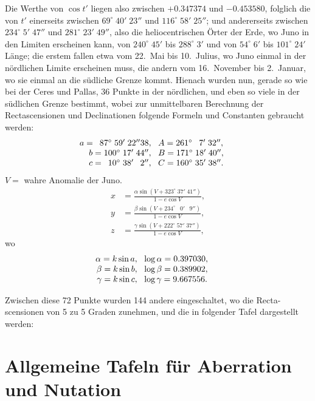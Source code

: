 \documentclass[12pt,a4paper]{article}
\begin{document}
Die Werthe von $\cos t'$ liegen also zwischen $+0.347374$ und $-0.453580$,
folglich die von $t'$ einerseits zwischen $69^{\circ}\;40'\;23''$ und $116^{\circ}\;58'\;25''$;
und andererseits zwischen $234^{\circ}\;5'\;47''$ und $281^{\circ}\;23'\;49''$, also die
heliocentrischen Örter der Erde, wo Juno in den Limiten erscheinen kann, von
$240^{\circ}\;45'$ bis $288^{\circ}\;3'$ und von $54^{\circ}\;6'$ bis $101^{\circ}\;24'$ Länge;
die erstem fallen etwa vom 22.\ Mai bis 10.\ Julius, wo Juno einmal in der
nördlichen Limite erscheinen muss, die andern vom 16.\ November bis 2.\ Januar,
wo sie einmal an die südliche Grenze kommt. Hienach wurden nun, gerade so
wie bei der Ceres und Pallas, 36 Punkte in der nördlichen, und eben so viele
in der südlichen Grenze bestimmt, wobei zur unmittelbaren Berechnung der
Rectascensionen und Declinationen folgende Formeln und Constanten gebraucht
werden:
\[
\begin{array}{r@{\;\;\;}l@{\qquad}r@{\;\;\;}l}
a = \phantom{0}87^{\circ}\;59'\;22''38, & A = 261^{\circ}\;\phantom{0}7'\;32'',\\
b = 100^{\circ}\;17'\;44'', & B = 171^{\circ}\;18'\;40'',\\
c = \phantom{0}10^{\circ}\;38'\;\phantom{0}2'', & C = 160^{\circ}\;35'\;38''.
\end{array}
\]
$V =$ wahre Anomalie der Juno.
\begin{align*}
x &= \frac{\alpha\sin(V + 323^{\circ}\;37'\;41'')}{1 - e\cos V},\\
y &= \frac{\beta\sin(V + 234^{\circ}\;\phantom{0}0'\;\phantom{0}9'')}{1 - e\cos V},\\
z &= \frac{\gamma\sin(V + 222^{\circ}\;57'\;37'')}{1 - e\cos V},
\end{align*}
wo
\[
\begin{array}{r@{\;\;\;}l@{\qquad}r@{\;\;\;}l@{\qquad}r@{\;\;\;}l}
\alpha = k\sin a, & \log\alpha = 0.397030,\\
\beta = k\sin b, & \log\beta = 0.389902,\\
\gamma = k\sin c, & \log\gamma = 9.667556.
\end{array}
\]

Zwischen diese 72 Punkte wurden 144 andere eingeschaltet, wo die Recta-
scensionen von 5 zu 5 Graden zunehmen, und die in folgender Tafel dargestellt
werden:

\newpage
\section{Allgemeine Tafeln für Aberration und Nutation}
\label{sec:tafeln}
\end{document}
